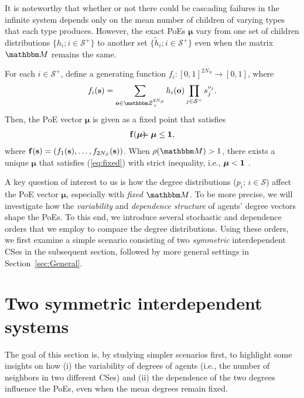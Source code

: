 \documentclass[10pt, journal, compsoc]{IEEEtran}
\newcommand {\cS}{{\mathcal{S}}}
\newcommand {\bM} {{\mathbbm M}}
\newcommand {\bo} {{\bf o}}
\newcommand {\bs} {{\bf s}}
\newcommand {\bmu} {\boldsymbol{\mu}}
\newcommand {\Z} {{\mathbbm Z}}
\newcommand{\beqa}{\begin{eqnarray}}
\newcommand{\eeqa}{\end{eqnarray}}
\newcommand{\beqan}{\begin{eqnarray*}}
\newcommand{\eeqan}{\end{eqnarray*}}
\newcommand{\myeq}{& \hspace{-0.1in} = & \hspace{-0.1in}}
\newcommand{\E}[1]{{\mathbbm E}\left[ #1 \right]}
\begin{document}
It is noteworthy that whether or not there
could be cascading failures in the infinite
system depends only on the 
mean number of children of varying types
that each type produces.
However, the exact
PoEs $\bmu$ vary from one set of children
distributions $\{h_i; i \in \cS^+\}$ to another 
set $\{\tilde{h}_i; i \in \cS^+\}$
even when the matrix $\bM$ remains the same.

For each $i \in \cS^+$, define a generating
function $f_i: [0, 1]^{2 N_S} \to [0, 1]$, 
where 
\beqan
f_i(\bs) = \sum_{\bo \in \Z_+^{2 N_S}} 
	h_i(\bo) \prod_{j \in \cS^+} s_j^{o_j}.
	\label{eq:fi}
\eeqan
Then, the PoE vector $\boldsymbol{\mu}$ is given as a 
fixed point that satisfies 
\beqa
{\bf f}(\bmu)
\myeq \bmu \leq {\bf 1}, 
	\label{eq:fixed}
\eeqa
where ${\bf f}(\bs) = (f_1(\bs), \ldots, f_{2N_S}(\bs))$.
When $\rho(\bM) > 1$, there exists a unique $\bmu$
that satisfies (\ref{eq:fixed}) with strict
inequality, i.e., $\bmu < {\bf 1}$
\cite{Harris}. 

A key question of interest to us is how the degree 
distributions ($p_i$; $i \in \cS$) affect the PoE 
vector $\boldsymbol{\mu}$, especially with 
{\em fixed} $\bM$. To be more precise, we
will investigate how the {\em variability} and 
{\em dependence structure} of agents' degree vectors
shape the PoEs.  
To this end, we introduce
several stochastic and dependence orders that we
employ to compare the degree distributions. 
Using these orders, we first examine a simple
scenario consisting of two {\em symmetric} 
interdependent CSes in the subsequent section, 
followed by more general 
settings in Section~\ref{sec:General}.


	



\section{Two symmetric interdependent systems}
	\label{sec:Two}

The goal of this section is, by studying 
simpler scenarios first, to highlight 
some insights on how (i) the variability of 
degrees of agents
(i.e., the number of neighbors in two different
CSes) and (ii) the dependence of the two degrees
influence the PoEs, even when the mean degrees
remain fixed. 
\end{document}

